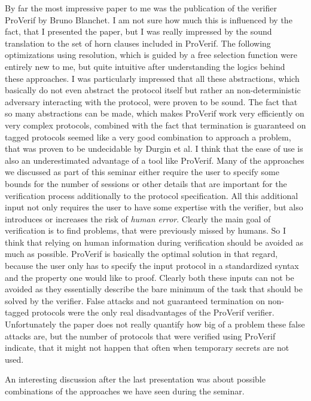 \documentclass[a4paper,UKenglish]{lipics-v2018}
\begin{document}
By far the most impressive paper to me was the publication of the verifier ProVerif by Bruno Blanchet.\cite{ProVerif} I am not sure how much this is influenced by the fact, that I presented the paper, but I was really impressed by the sound translation to the set of horn clauses included in ProVerif. The following optimizations using resolution, which is guided by a free selection function were entirely new to me, but quite intuitive after understanding the logics behind these approaches. I was particularly impressed that all these abstractions, which basically do not even abstract the protocol itself but rather an non-deterministic adversary interacting with the protocol, were proven to be sound. The fact that so many abstractions can be made, which makes ProVerif work very efficiently on very complex protocols, combined with the fact that termination is guaranteed on tagged protocols seemed like a very good combination to approach a problem, that was proven to be undecidable by Durgin et al.\cite{DLMS99}
I think that the ease of use is also an underestimated advantage of a tool like ProVerif. Many of the approaches we discussed as part of this seminar either require the user to specify some bounds for the number of sessions or other details that are important for the verification process additionally to the protocol specification. All this additional input not only requires the user to have some expertise with the verifier, but also introduces or increases the risk of \textit{human error}. Clearly the main goal of verification is to find problems, that were previously missed by humans. So I think that relying on human information during verification should be avoided as much as possible. ProVerif is basically the optimal solution in that regard, because the user only has to specify the input protocol in a standardized syntax and the property one would like to proof. Clearly both these inputs can not be avoided as they essentially describe the bare minimum of the task that should be solved by the verifier.
False attacks and not guaranteed termination on non-tagged protocols were the only real disadvantages of the ProVerif verifier.
Unfortunately the paper does not really quantify how big of a problem these false attacks are, but the number of protocols that were verified using ProVerif indicate, that it might not happen that often when temporary secrets are not used.


\vspace{1cm}

An interesting discussion after the last presentation was about possible combinations of the approaches we have seen during the seminar. 
\end{document}
